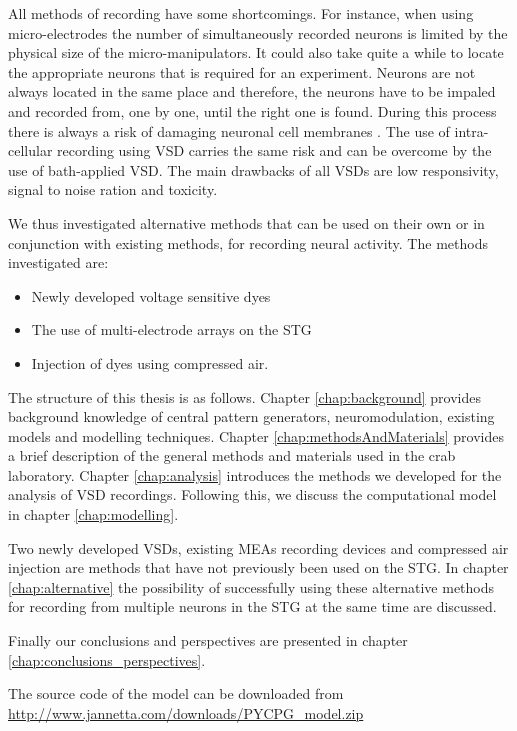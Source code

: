 All methods of recording have some shortcomings. For instance, when using micro-electrodes the number of simultaneously recorded neurons is limited by the physical size of the micro-manipulators. It could also take quite a while to locate the appropriate neurons that is required for an experiment. Neurons are not always located in the same place and therefore, the neurons have to be impaled and recorded from, one by one, until the right one is found. During this process there is always a risk of damaging neuronal cell membranes \cite{Staedele2012}. The use of intra-cellular recording using \ac{VSD} carries the same risk and can be overcome by the use of bath-applied \ac{VSD}. The main drawbacks of all \acp{VSD} are low responsivity, signal to noise ration and toxicity. 

We thus investigated alternative methods that can be used on their own or in conjunction with existing methods, for recording neural activity. The methods investigated are:

\begin{itemize}
	\item Newly developed voltage sensitive dyes
	\item The use of multi-electrode arrays on the \ac{STG}
	\item Injection of dyes using compressed air.
\end{itemize}

The structure of this thesis is as follows. Chapter \ref{chap:background} provides background knowledge of central pattern generators, neuromodulation, existing models and modelling techniques. Chapter \ref{chap:methodsAndMaterials} provides a brief description of the general methods and materials used in the crab laboratory. Chapter \ref{chap:analysis} introduces the methods we developed for the analysis of \ac{VSD} recordings. Following this, we discuss the computational model in chapter \ref{chap:modelling}. 

Two newly developed \acp{VSD}, existing \acp{MEA} recording devices and compressed air injection are methods that have not previously been used on the \ac{STG}. In chapter \ref{chap:alternative} the possibility of successfully using these alternative methods for recording from multiple neurons in the \ac{STG} at the same time are discussed. 


Finally our conclusions and perspectives are presented in chapter \ref{chap:conclusions_perspectives}. 

The \matlab source code of the model can be downloaded from \url{http://www.jannetta.com/downloads/PYCPG_model.zip}



